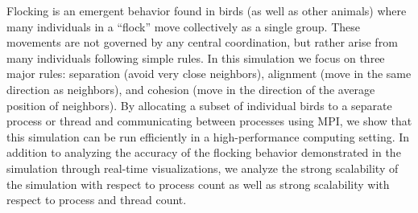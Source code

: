 \begin{small}
  Flocking is an emergent behavior found in birds (as well as other
  animals) where many individuals in a “flock” move collectively as a
  single group. These movements are not governed by any central
  coordination, but rather arise from many individuals following
  simple rules. In this simulation we focus on three major rules:
  separation (avoid very close neighbors), alignment (move in the same
  direction as neighbors), and cohesion (move in the direction of the
  average position of neighbors). By allocating a subset of individual
  birds to a separate process or thread and communicating between
  processes using MPI, we show that this simulation can be run
  efficiently in a high-performance computing setting. In addition to
  analyzing the accuracy of the flocking behavior demonstrated in the
  simulation through real-time visualizations, we analyze the strong
  scalability of the simulation with respect to process count as well
  as strong scalability with respect to process and thread count.
\end{small}
